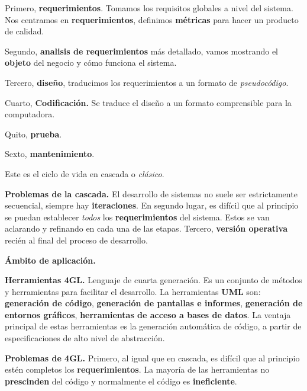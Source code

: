 \documentclass{article}
\begin{document}
Primero, \textbf{requerimientos}. Tomamos los requisitos globales a 
nivel del sistema. Nos centramos en \textbf{requerimientos}, definimos 
\textbf{métricas} para hacer un producto de calidad. 

Segundo, \textbf{analisis de requerimientos} más detallado, vamos mostrando el 
\textbf{objeto} del negocio y cómo funciona el sistema. 

Tercero, \textbf{diseño}, traducimos los requerimientos a un formato de 
\textit{pseudocódigo}.

Cuarto, \textbf{Codificación.} Se traduce el diseño a un formato comprensible para la 
computadora. 

Quito, \textbf{prueba}.

Sexto, \textbf{mantenimiento}.

Este es el ciclo de vida en cascada o \textit{clásico}.

\textbf{Problemas de la cascada.} El desarrollo de sistemas no suele ser 
estrictamente secuencial, siempre hay \textbf{iteraciones}. En segundo lugar,
es difícil que al principio se puedan establecer \textit{todos} los 
\textbf{requerimientos} del sistema. Estos se van aclarando y refinando en cada 
una de las etapas. Tercero, \textbf{versión operativa} recién al final del 
proceso de desarrollo.

\textbf{Ámbito de aplicación.}

\textbf{Herramientas 4GL.} Lenguaje de cuarta generación. Es un conjunto de 
métodos y herramientas para facilitar el desarrollo. La herramientas 
\textbf{UML} son: \textbf{generación de código}, 
\textbf{generación de pantallas e informes}, 
\textbf{generación de entornos gráficos}, 
\textbf{herramientas de acceso a bases de datos}.
La ventaja principal de estas herramientas es la generación automática de código,
a partir de especificaciones de alto nivel de abstracción.

\textbf{Problemas de 4GL.} Primero, al igual que en cascada, es difícil que al 
principio estén completos los \textbf{requerimientos}. La mayoría de las 
herramientas no \textbf{prescinden} del código y normalmente el código es 
\textbf{ineficiente}.
\end{document}
